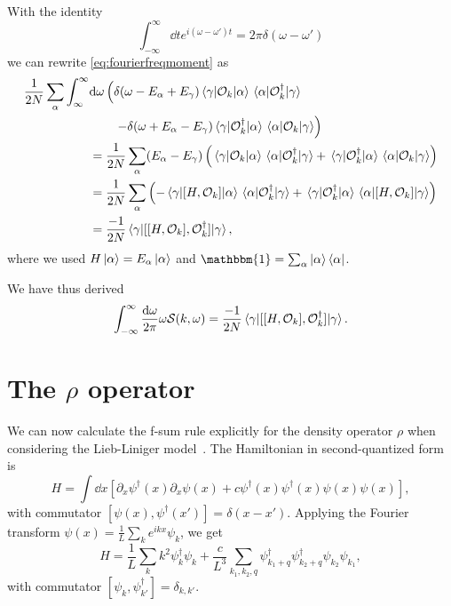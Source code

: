 \documentclass[11pt, a4paper]{report} %
\begin{document}
With the identity
\begin{equation}
  \int_{-\infty}^{\infty} \dd t e^{i(\omega-\omega')t} = 2\pi \delta(\omega-\omega')
\end{equation}
we can rewrite \cref{eq:fourierfreqmoment} as 
\begin{align}
  \frac{1}{2N} \sum_{\alpha} \int_{\infty}^{\infty}&\dd \omega  \left(\delta(\omega-E_{\alpha}+E_{\gamma})\matrixel{\gamma}{\mathcal{O}_k}{\alpha}\matrixel{\alpha}{\mathcal{O}_{k}^{\dagger}}{\gamma}\right. \nonumber\\
&\qquad\left.- \delta(\omega+E_{\alpha}-E_{\gamma})\matrixel{\gamma}{\mathcal{O}_{k}^{\dagger}}{\alpha}\matrixel{\alpha}{\mathcal{O}_k}{\gamma}\right)\\
&=\frac{1}{2N} \sum_{\alpha} (E_{\alpha} - E_{\gamma}) \left(\matrixel{\gamma}{\mathcal{O}_k}{\alpha}\matrixel{\alpha}{\mathcal{O}_{k}^{\dagger}}{\gamma} + \matrixel{\gamma}{\mathcal{O}_{k}^{\dagger}}{\alpha}\matrixel{\alpha}{\mathcal{O}_k}{\gamma}\right)\\
&=\frac{1}{2N} \sum_{\alpha}  \left(-\matrixel{\gamma}{[H,\mathcal{O}_k]}{\alpha}\matrixel{\alpha}{\mathcal{O}_{k}^{\dagger}}{\gamma} + \matrixel{\gamma}{\mathcal{O}_{k}^{\dagger}}{\alpha}\matrixel{\alpha}{[H,\mathcal{O}_k]}{\gamma}\right)\\
&=\frac{-1}{2N} \matrixel{\gamma}{[[H,\mathcal{O}_k],\mathcal{O}_{k}^{\dagger}]}{\gamma},
\end{align}
where we used \(H\ket{\alpha}=E_{\alpha}\ket{\alpha}\) and \(\mathbbm{1}=\sum_{\alpha}\ket{\alpha}\bra{\alpha}\).

We have thus derived~\cite{Cauxfsum}
\begin{align}
  \int_{-\infty}^{\infty}\frac{\dd \omega}{2\pi} \omega \mathcal{S}(k,\omega) = \frac{-1}{2N} \matrixel{\gamma}{[[H,\mathcal{O}_k],\mathcal{O}_{k}^{\dagger}]}{\gamma}.
\end{align}


\section{The $\rho$ operator}

\begin{sloppypar}
We can now calculate the f-sum rule explicitly for the density operator \(\rho\) when considering the Lieb-Liniger model~\cite{Cauxfsum}.
The Hamiltonian in second-quantized form is~\cite{Franchini2017} 
\begin{equation}
  \label{eq:1}
  H = \int \dd x \left[\partial_x\psi^{\dag}(x) \partial_{x} \psi(x) + c \psi^{\dag}(x)\psi^{\dag}(x)\psi(x)\psi(x)\right],
\end{equation}
with commutator \([\psi(x), \psi^{\dagger}(x')] = \delta(x-x')\).
Applying the Fourier transform \(\psi (x) = \frac{1}{L}\sum_{k} e^{ikx}\psi_k\), we get
\begin{equation}
  \label{eq:2}
  H = \frac{1}{L} \sum_k k^2 \psi^{\dagger}_{k}\psi_k +\frac{c}{L^3} \sum_{k_1,k_2,q} \psi^{\dag}_{k_1+q} \psi^{\dag}_{k_2+q} \psi_{k_2} \psi_{k_1},
\end{equation}
with commutator \([\psi_k,\psi_{k'}^{\dag}]=\delta_{k,k'}\).
\end{sloppypar}
\end{document}

